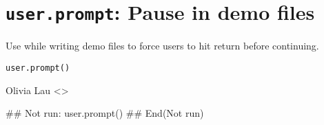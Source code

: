  \section{{\tt user.prompt}: Pause in demo files}\label{ss:user.prompt}
\begin{Description}\relax
Use  while writing demo files to force users to hit
return before continuing.
\end{Description}
\begin{Usage}
\begin{verbatim}
user.prompt()
\end{verbatim}
\end{Usage}
\begin{Author}\relax
Olivia Lau <>
\end{Author}
\begin{SeeAlso}\relax
{}
\end{SeeAlso}
\begin{Examples}
\begin{ExampleCode}
## Not run: 
user.prompt()
## End(Not run)
\end{ExampleCode}
\end{Examples}


